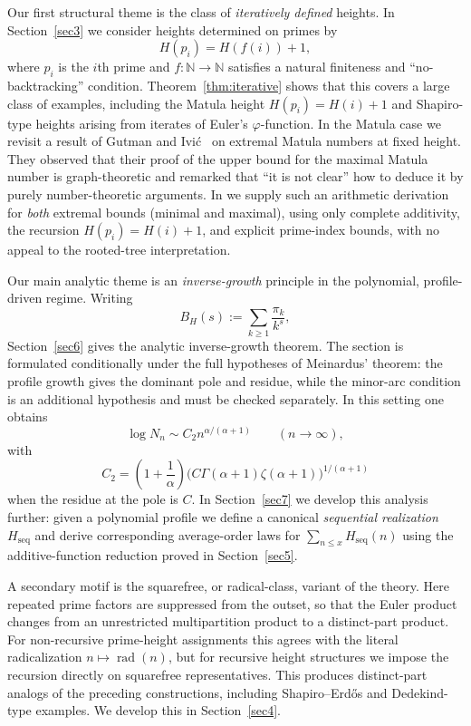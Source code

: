 \documentclass[11pt]{article}
\theoremstyle{definition}
\newcommand{\height}{H}
\begin{document}
Our first structural theme is the class of \emph{iteratively defined} heights.
In Section~\ref{sec3} we consider heights determined on primes by
\[
  H(p_i) = H(f(i)) + 1,
\]
where $p_i$ is the $i$th prime and $f:\mathbb{N}\to\mathbb{N}$ satisfies a
natural finiteness and ``no-backtracking'' condition.  Theorem~\ref{thm:iterative}
shows that this covers a large class of examples, including the Matula height
$H(p_i)=H(i)+1$ and Shapiro-type heights arising from iterates of Euler's
$\varphi$-function.  In the Matula case we revisit a result of Gutman and Ivi\'c~\cite{gutman} on
extremal Matula numbers at fixed height.  They observed that their proof of the
upper bound for the maximal Matula number is graph-theoretic and remarked that
``it is not clear'' how to deduce it by purely number-theoretic arguments.  In
 we supply such an arithmetic derivation for \emph{both} extremal
bounds (minimal and maximal), using only complete additivity, the recursion
$H(p_i)=H(i)+1$, and explicit prime-index bounds, with no appeal to the rooted-tree
interpretation.



Our main analytic theme is an \emph{inverse-growth} principle in the polynomial,
profile-driven regime.  Writing
\[
  B_H(s) := \sum_{k\ge1} \frac{\pi_k}{k^s},
\]
Section~\ref{sec6} gives the analytic inverse-growth theorem.  The section is
formulated conditionally under the full hypotheses of Meinardus' theorem: the
profile growth gives the dominant pole and residue, while the minor-arc
condition is an additional hypothesis and must be checked separately.  In this
setting one obtains
\[
  \log N_n \sim C_2n^{\alpha/(\alpha+1)}
  \qquad (n\to\infty),
\]
with
\[
  C_2=
  \left(1+\frac1\alpha\right)
  \bigl(C\Gamma(\alpha+1)\zeta(\alpha+1)\bigr)^{1/(\alpha+1)}
\]
when the residue at the pole is $C$.  In Section~\ref{sec7} we develop this analysis
further: given a polynomial profile we define a canonical \emph{sequential
realization} $\height_{\mathrm{seq}}$ and derive corresponding average-order
laws for $\sum_{n\le x}\height_{\mathrm{seq}}(n)$ using the additive-function
reduction proved in Section~\ref{sec5}.


A secondary motif is the squarefree, or radical-class, variant of the theory.
Here repeated prime factors are suppressed from the outset, so that the Euler
product changes from an unrestricted multipartition product to a distinct-part
product.  For non-recursive prime-height assignments this agrees with the
literal radicalization \(n\mapsto \operatorname{rad}(n)\), but for recursive
height structures we impose the recursion directly on squarefree representatives.
This produces distinct-part analogs of the preceding constructions, including
Shapiro--Erd\H{o}s and Dedekind-type examples.  We develop
this in Section~\ref{sec4}.
\end{document}
